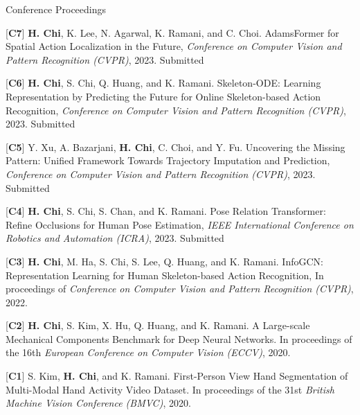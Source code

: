 


\begin{cventries}
\cvpub
{Conference Proceedings} %
{ %
\begin{cvitems}
\item {[\textbf{C7}] \textbf{H. Chi}, K. Lee, N. Agarwal, K. Ramani, and C. Choi. AdamsFormer for Spatial Action Localization in the Future, \textit{Conference on Computer Vision and Pattern Recognition (CVPR)}, 2023. Submitted}
\item {[\textbf{C6}] \textbf{H. Chi}, S. Chi, Q. Huang, and K. Ramani. Skeleton-ODE: Learning Representation by Predicting the Future for Online Skeleton-based Action Recognition, \textit{Conference on Computer Vision and Pattern Recognition (CVPR)}, 2023. Submitted}
\item {[\textbf{C5}] Y. Xu, A. Bazarjani, \textbf{H. Chi}, C. Choi, and Y. Fu. Uncovering the Missing Pattern: Unified Framework Towards Trajectory Imputation and Prediction, \textit{Conference on Computer Vision and Pattern Recognition (CVPR)}, 2023. Submitted}
\item {[\textbf{C4}] \textbf{H. Chi}, S. Chi, S. Chan, and K. Ramani. Pose Relation Transformer: Refine Occlusions for Human Pose Estimation, \textit{IEEE International Conference on Robotics and Automation (ICRA)}, 2023. Submitted}
\item {[\textbf{C3}] \textbf{H. Chi}, M. Ha, S. Chi, S. Lee, Q. Huang, and K. Ramani. InfoGCN: Representation Learning for Human Skeleton-based Action Recognition, In proceedings of \textit{Conference on Computer Vision and Pattern Recognition (CVPR)}, 2022.}
\item {[\textbf{C2}] \textbf{H. Chi}, S. Kim, X. Hu, Q. Huang, and K. Ramani. A Large-scale Mechanical Components Benchmark for Deep Neural Networks. In proceedings of the 16th \textit{European Conference on Computer Vision (ECCV)}, 2020.}
\item {[\textbf{C1}] S. Kim, \textbf{H. Chi}, and K. Ramani. First-Person View Hand Segmentation of Multi-Modal Hand Activity Video Dataset. In proceedings of the 31st \textit{British Machine Vision Conference (BMVC)}, 2020.}
\end{cvitems}
}


\end{cventries}
